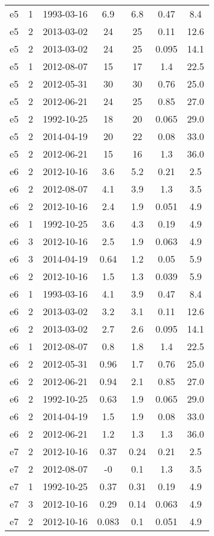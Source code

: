 \begin{table*}[htp]
\begin{tabular}{ccccccc}
e5 & 1 & 1993-03-16 & 6.9 & 6.8 & 0.47 & 8.4 \\
e5 & 2 & 2013-03-02 & 24 & 25 & 0.11 & 12.6 \\
e5 & 2 & 2013-03-02 & 24 & 25 & 0.095 & 14.1 \\
e5 & 1 & 2012-08-07 & 15 & 17 & 1.4 & 22.5 \\
e5 & 2 & 2012-05-31 & 30 & 30 & 0.76 & 25.0 \\
e5 & 2 & 2012-06-21 & 24 & 25 & 0.85 & 27.0 \\
e5 & 2 & 1992-10-25 & 18 & 20 & 0.065 & 29.0 \\
e5 & 2 & 2014-04-19 & 20 & 22 & 0.08 & 33.0 \\
e5 & 2 & 2012-06-21 & 15 & 16 & 1.3 & 36.0 \\
e6 & 2 & 2012-10-16 & 3.6 & 5.2 & 0.21 & 2.5 \\
e6 & 2 & 2012-08-07 & 4.1 & 3.9 & 1.3 & 3.5 \\
e6 & 2 & 2012-10-16 & 2.4 & 1.9 & 0.051 & 4.9 \\
e6 & 1 & 1992-10-25 & 3.6 & 4.3 & 0.19 & 4.9 \\
e6 & 3 & 2012-10-16 & 2.5 & 1.9 & 0.063 & 4.9 \\
e6 & 3 & 2014-04-19 & 0.64 & 1.2 & 0.05 & 5.9 \\
e6 & 2 & 2012-10-16 & 1.5 & 1.3 & 0.039 & 5.9 \\
e6 & 1 & 1993-03-16 & 4.1 & 3.9 & 0.47 & 8.4 \\
e6 & 2 & 2013-03-02 & 3.2 & 3.1 & 0.11 & 12.6 \\
e6 & 2 & 2013-03-02 & 2.7 & 2.6 & 0.095 & 14.1 \\
e6 & 1 & 2012-08-07 & 0.8 & 1.8 & 1.4 & 22.5 \\
e6 & 2 & 2012-05-31 & 0.96 & 1.7 & 0.76 & 25.0 \\
e6 & 2 & 2012-06-21 & 0.94 & 2.1 & 0.85 & 27.0 \\
e6 & 2 & 1992-10-25 & 0.63 & 1.9 & 0.065 & 29.0 \\
e6 & 2 & 2014-04-19 & 1.5 & 1.9 & 0.08 & 33.0 \\
e6 & 2 & 2012-06-21 & 1.2 & 1.3 & 1.3 & 36.0 \\
e7 & 2 & 2012-10-16 & 0.37 & 0.24 & 0.21 & 2.5 \\
e7 & 2 & 2012-08-07 & -0 & 0.1 & 1.3 & 3.5 \\
e7 & 1 & 1992-10-25 & 0.37 & 0.31 & 0.19 & 4.9 \\
e7 & 3 & 2012-10-16 & 0.29 & 0.14 & 0.063 & 4.9 \\
e7 & 2 & 2012-10-16 & 0.083 & 0.1 & 0.051 & 4.9 \\

\end{tabular}
\end{table*}
